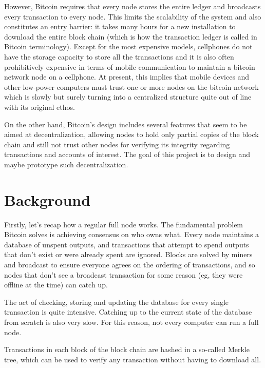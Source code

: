 \documentclass[a4paper,12pt]{article}
\begin{document}
However, Bitcoin requires that every node stores the entire ledger and broadcasts every transaction to every node. This limits the scalability of the system and also constitutes an entry barrier: it takes many hours for a new installation to download the entire block chain (which is how the transaction ledger is called in Bitcoin terminology). Except for the most expensive models, cellphones do not have the storage capacity to store all the transactions and it is also often prohibitively expensive in terms of mobile communication to maintain a bitcoin network node on a cellphone. At present, this implies that mobile devices and other low-power computers must trust one or more nodes
on the bitcoin network which is slowly but surely turning into a centralized structure quite out of line with its original ethos.

On the other hand, Bitcoin's design includes several features that seem to be aimed at decentralization, allowing nodes to hold only partial copies of the block chain and still not trust other nodes for verifying its integrity regarding transactions and accounts of interest. The goal of this project is to design and maybe prototype such decentralization.

\section{Background}

Firstly, let's recap how a regular full node works. The fundamental problem Bitcoin solves is achieving consensus on who owns what. Every node maintains a database of unspent outputs, and transactions that attempt to spend outputs that don't exist or were already spent are ignored. Blocks are solved by miners and broadcast to ensure everyone agrees on the ordering of transactions, and so nodes that don't see a broadcast transaction for some reason (eg, they were offline at the time) can catch up.

The act of checking, storing and updating the database for every single transaction is quite intensive. Catching up to the current state of the database from scratch is also very slow. For this reason, not every computer can run a full node.

Transactions in each block of the block chain are hashed in a so-called Merkle tree, which can be used to verify any transaction without having to download all. 
\end{document}
